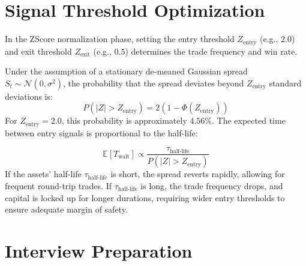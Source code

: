 \documentclass[10pt,a4paper,twocolumn]{article}
\newcommand{\tauhl}{\tau_{\text{half-life}}}
\begin{document}
\section{Signal Threshold Optimization}

In the ZScore normalization phase, setting the entry threshold $Z_{\text{entry}}$ (e.g., $2.0$) and exit threshold $Z_{\text{exit}}$ (e.g., $0.5$) determines the trade frequency and win rate. 

Under the assumption of a stationary de-meaned Gaussian spread $S_t \sim \mathcal{N}(0, \sigma^2)$, the probability that the spread deviates beyond $Z_{\text{entry}}$ standard deviations is:
\[
  P(|Z| > Z_{\text{entry}}) = 2 \left( 1 - \Phi(Z_{\text{entry}}) \right)
\]
For $Z_{\text{entry}} = 2.0$, this probability is approximately $4.56\%$. The expected time between entry signals is proportional to the half-life:
\begin{tcolorbox}[mathbox={Expected Trade Frequency}]
\begin{equation}
  \mathbb{E}[T_{\text{wait}}] \propto \frac{\tauhl}{P(|Z| > Z_{\text{entry}})}
\end{equation}
If the assets' half-life $\tauhl$ is short, the spread reverts rapidly, allowing for frequent round-trip trades. If $\tauhl$ is long, the trade frequency drops, and capital is locked up for longer durations, requiring wider entry thresholds to ensure adequate margin of safety.
\end{tcolorbox}

\section{Interview Preparation}
\end{document}
